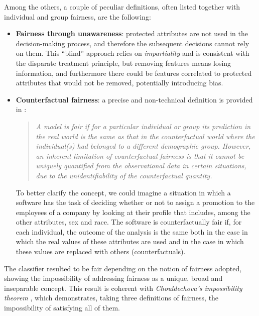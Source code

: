 Among the others, a couple of peculiar definitions, often listed together with individual and group fairness, are the following:
\begin{itemize}
\item \textbf{Fairness through unawareness}: protected attributes are not used in the decision-making process, and therefore the subsequent decisions cannot rely on them. This ``blind'' approach relies on \textit{impartiality} and is consistent with the disparate treatment principle, but removing features means losing information, and furthermore there could be features correlated to protected attributes that would not be removed, potentially introducing bias.
\item \textbf{Counterfactual fairness}: a precise and non-technical definition is provided in \cite{wu2019counterfactual}:
\begin{quote}\emph{A model is fair if for a particular individual or group its prediction in the real world is the same as that in the counterfactual world where the individual(s) had belonged to a different demographic group. However, an inherent limitation of counterfactual fairness is that it cannot be uniquely quantified from the observational data in certain situations, due to the unidentifiability of the counterfactual quantity.} \cite[p.~1]{wu2019counterfactual}\end{quote}
To better clarify the concept, we could imagine a situation in which a software has the task of deciding whether or not to assign a promotion to the employees of a company by looking at their profile that includes, among the other attributes, sex and race. The software is counterfactually fair if, for each individual, the outcome of the analysis is the same both in the case in which the real values of these attributes are used and in the case in which these values are replaced with others (counterfactuals).
\end{itemize}

The classifier resulted to be fair depending on the notion of fairness adopted, showing the impossibility of addressing fairness as a unique, broad and inseparable concept. This result is coherent with \textit{Chouldechova's impossibility theorem} \cite{chouldechova2017fair}, which demonstrates, taking three definitions of fairness, the impossibility of satisfying all of them.
